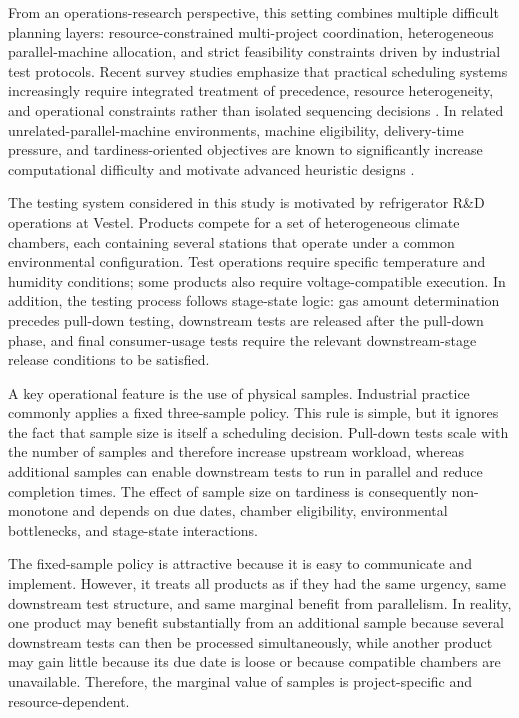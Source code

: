\documentclass[11pt]{article}
\begin{document}
From an operations-research perspective, this setting combines multiple difficult planning layers: resource-constrained multi-project coordination, heterogeneous parallel-machine allocation, and strict feasibility constraints driven by industrial test protocols. Recent survey studies emphasize that practical scheduling systems increasingly require integrated treatment of precedence, resource heterogeneity, and operational constraints rather than isolated sequencing decisions \citep{HartmannBriskorn2022,GomezSanchezLallaRuizFernandezGilCastroVoss2023}. In related unrelated-parallel-machine environments, machine eligibility, delivery-time pressure, and tardiness-oriented objectives are known to significantly increase computational difficulty and motivate advanced heuristic designs \citep{UlagaDurasevicJakobovic2022,MaeckerShenMonch2023}.

The testing system considered in this study is motivated by refrigerator R\&D operations at Vestel. Products compete for a set of heterogeneous climate chambers, each containing several stations that operate under a common environmental configuration. Test operations require specific temperature and humidity conditions; some products also require voltage-compatible execution. In addition, the testing process follows stage-state logic: gas amount determination precedes pull-down testing, downstream tests are released after the pull-down phase, and final consumer-usage tests require the relevant downstream-stage release conditions to be satisfied.

A key operational feature is the use of physical samples. Industrial practice commonly applies a fixed three-sample policy. This rule is simple, but it ignores the fact that sample size is itself a scheduling decision. Pull-down tests scale with the number of samples and therefore increase upstream workload, whereas additional samples can enable downstream tests to run in parallel and reduce completion times. The effect of sample size on tardiness is consequently non-monotone and depends on due dates, chamber eligibility, environmental bottlenecks, and stage-state interactions.

The fixed-sample policy is attractive because it is easy to communicate and implement. However, it treats all products as if they had the same urgency, same downstream test structure, and same marginal benefit from parallelism. In reality, one product may benefit substantially from an additional sample because several downstream tests can then be processed simultaneously, while another product may gain little because its due date is loose or because compatible chambers are unavailable. Therefore, the marginal value of samples is project-specific and resource-dependent.
\end{document}
